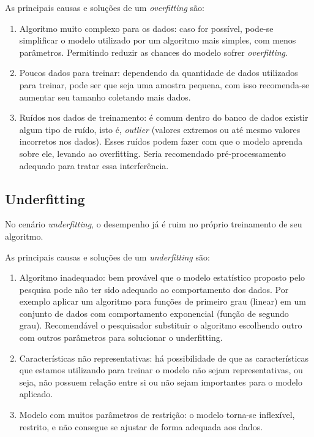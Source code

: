 \documentclass[
]{book}
\begin{document}
As principais causas e soluções de um \emph{overfitting} são:

\begin{enumerate}
\def\labelenumi{\arabic{enumi}.}
\item
  Algoritmo muito complexo para os dados: caso for possível, pode-se simplificar o modelo utilizado por um algoritmo mais simples, com menos parâmetros. Permitindo reduzir as chances do modelo sofrer \emph{overfitting}.
\item
  Poucos dados para treinar: dependendo da quantidade de dados utilizados para treinar, pode ser que seja uma amostra pequena, com isso recomenda-se aumentar seu tamanho coletando mais dados.
\item
  Ruídos nos dados de treinamento: é comum dentro do banco de dados existir algum tipo de ruído, isto é, \emph{outlier} (valores extremos ou até mesmo valores incorretos nos dados). Esses ruídos podem fazer com que o modelo aprenda sobre ele, levando ao overfitting. Seria recomendado pré-processamento adequado para tratar essa interferência.
\end{enumerate}

\hypertarget{underfitting}{%
\subsection{\texorpdfstring{\textbf{Underfitting}}{Underfitting}}\label{underfitting}}

No cenário \emph{underfitting}, o desempenho já é ruim no próprio treinamento de seu algoritmo.

As principais causas e soluções de um \emph{underfitting} são:

\begin{enumerate}
\def\labelenumi{\arabic{enumi}.}
\item
  Algoritmo inadequado: bem provável que o modelo estatístico proposto pelo pesquisa pode não ter sido adequado ao comportamento dos dados. Por exemplo aplicar um algoritmo para funções de primeiro grau (linear) em um conjunto de dados com comportamento exponencial (função de segundo grau). Recomendável o pesquisador substituir o algoritmo escolhendo outro com outros parâmetros para solucionar o underfitting.
\item
  Características não representativas: há possibilidade de que as características que estamos utilizando para treinar o modelo não sejam representativas, ou seja, não possuem relação entre si ou não sejam importantes para o modelo aplicado.
\item
  Modelo com muitos parâmetros de restrição: o modelo torna-se inflexível, restrito, e não consegue se ajustar de forma adequada aos dados.
\end{enumerate}
\end{document}
